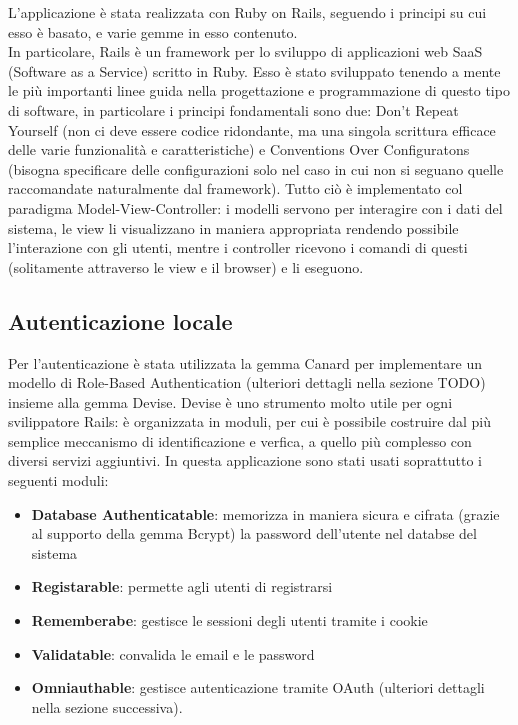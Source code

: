 \documentclass[Lau, binding=0.6cm, oneside]{sapthesis}
\begin{document}
L’applicazione è stata realizzata con Ruby on Rails, seguendo i principi su cui esso è basato, e varie gemme in esso contenuto.\\
In particolare, Rails è un framework per lo sviluppo di applicazioni web SaaS (Software as a Service) scritto in Ruby. Esso è stato sviluppato tenendo a mente le più importanti linee guida nella progettazione e programmazione di questo tipo di software, in particolare i principi fondamentali sono due: Don’t Repeat Yourself (non ci deve essere codice ridondante, ma una singola scrittura efficace delle varie funzionalità e caratteristiche) e Conventions Over Configuratons (bisogna specificare delle configurazioni solo nel caso in cui non si seguano quelle raccomandate naturalmente dal framework).
Tutto ciò è implementato col paradigma Model-View-Controller: i modelli servono per interagire con i dati del sistema, le view li visualizzano in maniera appropriata rendendo possibile l’interazione con gli utenti, mentre i controller ricevono i comandi di questi (solitamente attraverso le view e il browser) e li eseguono.

\subsection{Autenticazione locale}

Per l’autenticazione è stata utilizzata la gemma Canard per implementare un modello di Role-Based Authentication (ulteriori dettagli nella sezione TODO) insieme alla gemma Devise.
Devise è uno strumento molto utile per ogni svilippatore Rails: è organizzata in moduli, per cui è possibile costruire dal più semplice meccanismo di identificazione e verfica, a quello più complesso con diversi servizi aggiuntivi. In questa applicazione sono stati usati soprattutto i seguenti moduli:

\begin{itemize}
	\item \textbf{Database Authenticatable}: memorizza in maniera sicura e cifrata (grazie al supporto della gemma Bcrypt) la password dell’utente nel databse del sistema
	\item \textbf{Registarable}: permette agli utenti di registrarsi
	\item \textbf{Rememberabe}: gestisce le sessioni degli utenti tramite i cookie
	\item \textbf{Validatable}: convalida le email e le password
	\item \textbf{Omniauthable}: gestisce autenticazione tramite OAuth (ulteriori dettagli nella sezione successiva).
\end{itemize}
\end{document}
